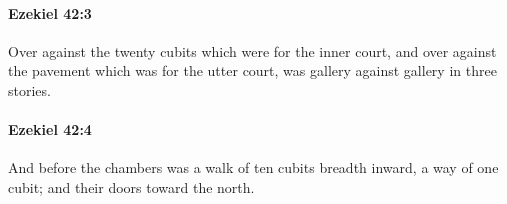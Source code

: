 		\paragraph{Ezekiel 42:3} %
			\label{EZEKIEL-42-3}

			Over against the twenty cubits which were for the inner court, and over against the pavement which was for the utter court, was gallery against gallery in three stories.


		\paragraph{Ezekiel 42:4} %
			\label{EZEKIEL-42-4}

			And before the chambers was a walk of ten cubits breadth inward, a way of one cubit; and their doors toward the north.


